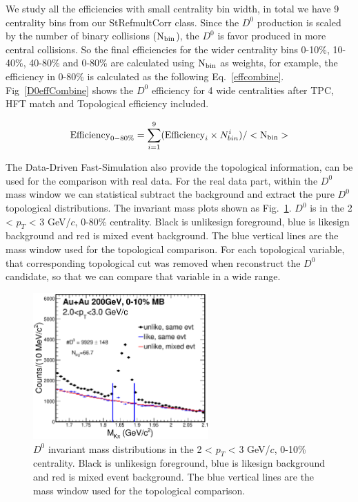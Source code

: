 \documentclass[a4paper]{article}
\begin{document}
We study all the efficiencies with small centrality bin width, in total we have 9 centrality bins from our StRefmultCorr class. Since the $D^0$ production is scaled by the number of binary collisions ($\textup{N}_{\textup{bin}}$), the $D^0$ is favor produced in more central collisions. So the final efficiencies for the wider centrality bins 0-10\%, 10-40\%, 40-80\% and 0-80\% are calculated using $\textup{N}_{\textup{bin}}$ as weights, for example, the efficiency in 0-80\% is calculated as the following Eq.~\ref{effcombine}. Fig~\ref{D0effCombine} shows the $D^0$ efficiency for 4 wide centralities after TPC, HFT match and Topological efficiency included.

\begin{equation}
  \textup{Efficiency}_{0-80\%} = \sum_{i=1}^{9}(\textup{Efficiency}_{i} \times N_{bin}^{i}) / <\textup{N}_{\textup{bin}}>
\label{effcombine}
\end{equation}

The Data-Driven Fast-Simulation also provide the topological information, can be used for the comparison with real data. For the real data part, within the $D^0$ mass window we can statistical subtract the background and extract the pure $D^0$ topological distributions. The invariant mass plots shown as Fig.~\ref{d0massforTopo}. $D^0$ is in the 2 < $p_T$ < 3 GeV/$c$, 0-80\% centrality. Black is unlikesign foreground, blue is likesign background and red is mixed event background. The blue vertical lines are the mass window used for the topological comparison. For each topological variable, that corresponding topological cut was removed when reconstruct the $D^0$ candidate, so that we can compare that variable in a wide range.

\begin{figure}[htbp]
\centering
\includegraphics[keepaspectratio,width=0.6\textwidth]{fig/Mixed_cent_8_9_pt_2_3.eps}
\caption{$D^0$ invariant mass distributions in the 2 < $p_T$ < 3 GeV/$c$, 0-10\% centrality. Black is unlikesign foreground, blue is likesign background and red is mixed event background. The blue vertical lines are the mass window used for the topological comparison.}
\label{d0massforTopo}
\end{figure}
\end{document}
